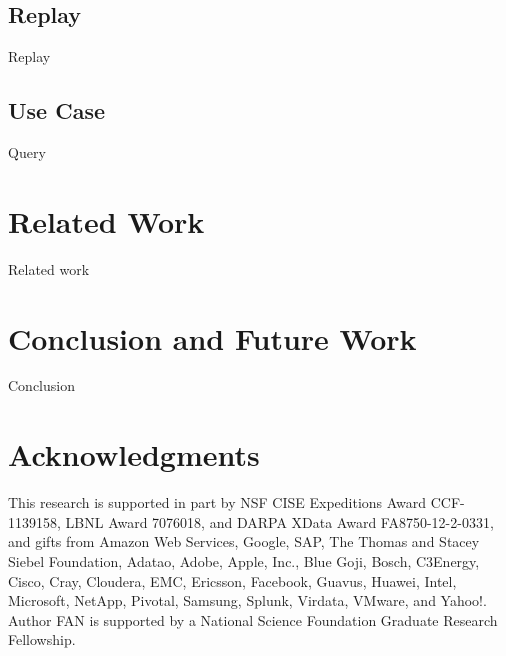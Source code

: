 \documentclass{sig-alternate}
\begin{document}
\subsection{Replay}
Replay

\subsection{Use Case}
Query

\section{Related Work}
\label{sec:Related}
Related work

\section{Conclusion and Future Work}
\label{sec:Conclusion}
Conclusion

\section{Acknowledgments}
This research is supported in part by NSF CISE Expeditions Award CCF-1139158, LBNL Award 7076018, and DARPA XData Award FA8750-12-2-0331, and gifts from Amazon Web Services, Google, SAP,  The Thomas and Stacey Siebel Foundation, Adatao, Adobe, Apple, Inc., Blue Goji, Bosch, C3Energy, Cisco, Cray, Cloudera, EMC, Ericsson, Facebook, Guavus, Huawei, Intel, Microsoft, NetApp, Pivotal, Samsung, Splunk, Virdata, VMware, and Yahoo!. Author FAN is supported by a National Science Foundation Graduate Research Fellowship.

%

%
%



\balancecolumns

\end{document}
